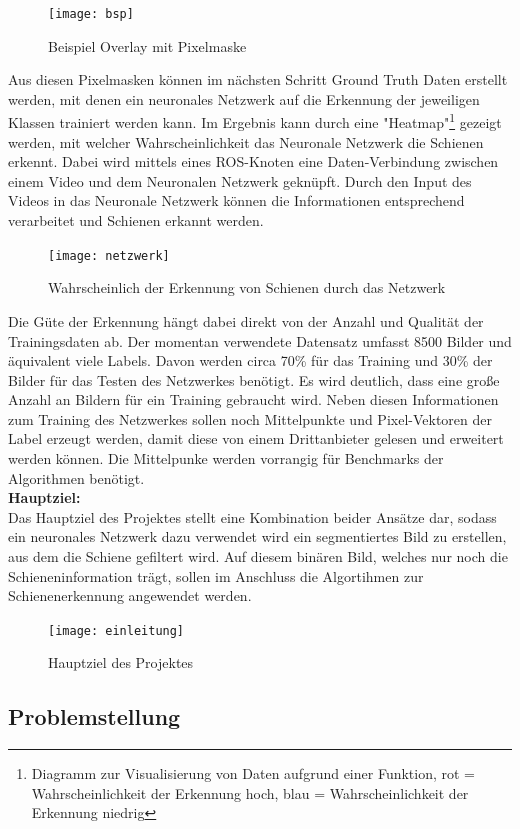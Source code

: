 \documentclass[11pt]{scrartcl}
\begin{document}
\begin{figure}[H]
  \texttt{[image: bsp]}
  \caption{Beispiel Overlay mit Pixelmaske}
\end{figure}
\noindent 
Aus diesen Pixelmasken können im nächsten Schritt Ground Truth Daten erstellt werden, mit denen ein neuronales Netzwerk auf die Erkennung der jeweiligen Klassen trainiert werden kann. Im Ergebnis kann durch eine "Heatmap"\footnote{Diagramm zur Visualisierung von Daten aufgrund einer Funktion, rot = Wahrscheinlichkeit der Erkennung hoch, blau = Wahrscheinlichkeit der Erkennung niedrig} gezeigt werden, mit welcher Wahrscheinlichkeit das Neuronale Netzwerk die Schienen erkennt. Dabei wird mittels eines ROS-Knoten eine Daten-Verbindung zwischen einem Video und dem Neuronalen Netzwerk geknüpft. Durch den Input des Videos in das Neuronale Netzwerk können die Informationen entsprechend verarbeitet und Schienen erkannt werden.
\begin{figure}[H]
  \texttt{[image: netzwerk]}
  \caption{Wahrscheinlich der Erkennung von Schienen durch das Netzwerk}
\end{figure}
\noindent 
Die Güte der Erkennung hängt dabei direkt von der Anzahl und Qualität der Trainingsdaten ab. Der momentan verwendete Datensatz  umfasst 8500 Bilder und äquivalent viele Labels. Davon werden circa 70\% für das Training und 30\% der Bilder für das Testen des Netzwerkes benötigt. Es wird deutlich, dass eine große Anzahl an Bildern für ein Training gebraucht wird. Neben diesen Informationen zum Training des Netzwerkes sollen noch Mittelpunkte und Pixel-Vektoren der Label erzeugt werden, damit diese von einem Drittanbieter gelesen und erweitert werden können. Die Mittelpunke werden vorrangig für Benchmarks der Algorithmen benötigt.
\\

\noindent
\textbf{Hauptziel:}
\\

\noindent
Das Hauptziel des Projektes stellt eine Kombination beider Ansätze dar, sodass ein neuronales Netzwerk dazu verwendet wird ein segmentiertes Bild zu erstellen, aus dem die Schiene gefiltert wird. Auf diesem binären Bild, welches nur noch die Schieneninformation trägt, sollen im Anschluss die Algortihmen zur Schienenerkennung angewendet werden. 
\begin{figure}[H]
  \texttt{[image: einleitung]}
  \caption{Hauptziel des Projektes}
\end{figure}
\noindent 
\subsection{Problemstellung}
\label{sec:Problemstellung}
\end{document}
